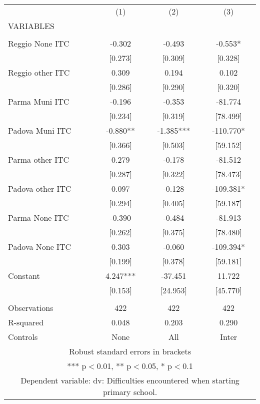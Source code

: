 \begin{tabular}{lccc} \hline
 & (1) & (2) & (3) \\
VARIABLES &  &  &  \\ \hline
 &  &  &  \\
Reggio None ITC & -0.302 & -0.493 & -0.553* \\
 & [0.273] & [0.309] & [0.328] \\
Reggio other ITC & 0.309 & 0.194 & 0.102 \\
 & [0.286] & [0.290] & [0.320] \\
Parma Muni ITC & -0.196 & -0.353 & -81.774 \\
 & [0.234] & [0.319] & [78.499] \\
Padova Muni ITC & -0.880** & -1.385*** & -110.770* \\
 & [0.366] & [0.503] & [59.152] \\
Parma other ITC & 0.279 & -0.178 & -81.512 \\
 & [0.287] & [0.322] & [78.473] \\
Padova other ITC & 0.097 & -0.128 & -109.381* \\
 & [0.294] & [0.405] & [59.187] \\
Parma None ITC & -0.390 & -0.484 & -81.913 \\
 & [0.262] & [0.375] & [78.480] \\
Padova None ITC & 0.303 & -0.060 & -109.394* \\
 & [0.199] & [0.378] & [59.181] \\
Constant & 4.247*** & -37.451 & 11.722 \\
 & [0.153] & [24.953] & [45.770] \\
 &  &  &  \\
Observations & 422 & 422 & 422 \\
R-squared & 0.048 & 0.203 & 0.290 \\
 Controls & None & All & Inter \\ \hline
\multicolumn{4}{c}{ Robust standard errors in brackets} \\
\multicolumn{4}{c}{ *** p$<$0.01, ** p$<$0.05, * p$<$0.1} \\
\multicolumn{4}{c}{ Dependent variable: dv: Difficulties encountered when starting primary school.} \\
\end{tabular}
